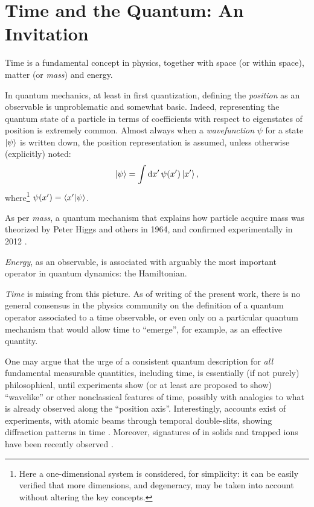\section{Time and the Quantum: An Invitation}\label{sec:intro}

% 

\noindent
Time is a fundamental concept in physics, together with space (or  within space),
matter (or \emph{mass}) and energy.

In quantum mechanics, at least in first quantization, defining the \emph{position} as
an observable is unproblematic and somewhat basic.
Indeed, representing the quantum state of a particle
in terms of coefficients with respect to eigenstates of position is extremely common.
Almost always when a \emph{wavefunction} $\psi$
for a state $\ket{\psi}$
is written down, the {position representation}
is assumed, unless otherwise (explicitly) noted:
\begin{equation}\label{eq:positionrepr}
  \ket{\psi} = \int \dd{x'} \psi(x') \ket{x'} \text{,}
\end{equation}
where\footnote{
  Here a one-dimensional system is considered, for simplicity:
  it can be easily verified that more dimensions,
  and degeneracy, may be taken into account without altering the key concepts.
}
$\psi(x') = \braket{x'}{\psi}$.

As per \emph{mass}, a quantum mechanism that explains how particle acquire mass was theorized by
Peter Higgs and others in 1964, and confirmed experimentally in 2012
\parencite{Higgs, EnglertBrout, Kibble+, HiggsATLAS, HiggsCMS}.

\emph{Energy}, as an observable, is associated with arguably the most important operator in quantum dynamics: the Hamiltonian.

\emph{Time} is missing from this picture. As of writing of the present work,
there is no general consensus in the physics community on
the definition of a quantum operator associated to a time observable,
or even only on a particular quantum mechanism that would allow time to ``emerge'',
for example, as an effective quantity.

One may argue that the urge of a consistent quantum description for \emph{all} fundamental
measurable quantities, including time,
is essentially (if not purely)
philosophical,
until experiments show (or at least are proposed to show)
``wavelike'' or other nonclassical features of time,
possibly with analogies to what is already observed along the ``position axis''.
Interestingly, accounts exist of experiments, with atomic beams through temporal double-slits,
showing diffraction patterns in time \parencite{TemporalSlits}.
Moreover, signatures of 
in solids and trapped ions have been recently observed
\parencite{crystal.exp.ordered, crystal.exp.disordered, crystal.exp.nmr, crystal.exp}.


